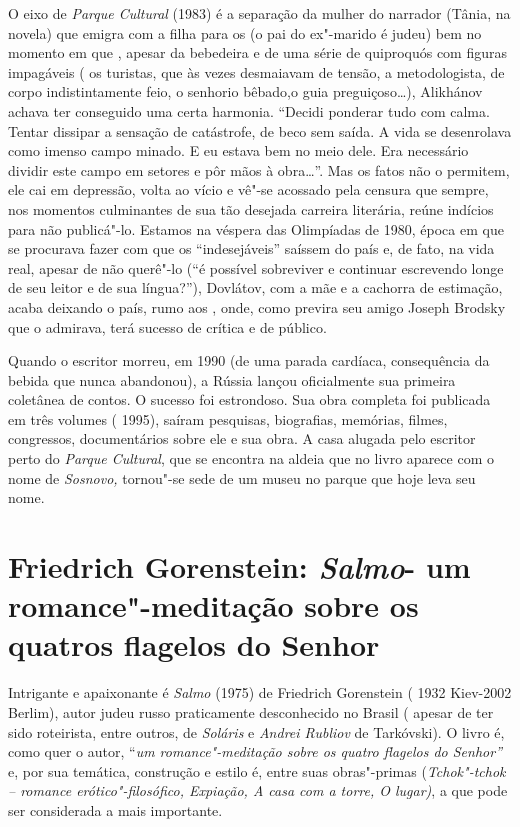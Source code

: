 O eixo de \emph{Parque Cultural} (1983) é a separação da mulher do
narrador (Tânia, na novela) que emigra com a filha para os  (o pai do
ex"-marido é judeu) bem no momento em que , apesar da bebedeira e de uma
série de quiproquós com figuras impagáveis ( os turistas, que às vezes
desmaiavam de tensão, a metodologista, de corpo indistintamente feio, o
senhorio bêbado,o guia preguiçoso\ldots{}), Alikhánov achava ter conseguido
uma certa harmonia. ``Decidi ponderar tudo com calma. Tentar dissipar a
sensação de catástrofe, de beco sem saída. A vida se desenrolava como
imenso campo minado. E eu estava bem no meio dele. Era necessário
dividir este campo em setores e pôr mãos à obra\ldots{}''. Mas os fatos não o
permitem, ele cai em depressão, volta ao vício e vê"-se acossado pela
censura que sempre, nos momentos culminantes de sua tão desejada
carreira literária, reúne indícios para não publicá"-lo. Estamos na
véspera das Olimpíadas de 1980, época em que se procurava fazer com que
os ``indesejáveis'' saíssem do país e, de fato, na vida real,
apesar de não querê"-lo (``é possível sobreviver e continuar escrevendo
longe de seu leitor e de sua língua?''), Dovlátov, com a mãe e a
cachorra de estimação, acaba deixando o país, rumo aos , onde, como
previra seu amigo Joseph Brodsky que o admirava, terá sucesso de crítica
e de público.

Quando o escritor morreu, em 1990 (de uma parada cardíaca, consequência
da bebida que nunca abandonou), a Rússia lançou oficialmente sua
primeira coletânea de contos. O sucesso foi estrondoso. Sua obra
completa foi publicada em três volumes ( 1995), saíram pesquisas,
biografias, memórias, filmes, congressos, documentários sobre ele e sua
obra. A casa alugada pelo escritor perto do \emph{Parque Cultural}, que
se encontra na aldeia que no livro aparece com o nome de \emph{Sosnovo,}
tornou"-se sede de um museu no parque que hoje leva seu nome.

\chapter{Friedrich Gorenstein: \emph{Salmo}- um romance"-meditação sobre os quatros flagelos do Senhor}

Intrigante e apaixonante é \emph{Salmo} (1975) de Friedrich Gorenstein (
1932 Kiev-2002 Berlim), autor judeu russo praticamente desconhecido no
Brasil ( apesar de ter sido roteirista, entre outros, de \emph{Soláris}
e \emph{Andrei Rubliov} de Tarkóvski). O livro é, como quer o autor,
``\emph{um romance"-meditação sobre os quatro flagelos do Senhor''} e,
por sua temática, construção e estilo é, entre suas obras"-primas
(\emph{Tchok"-tchok -- romance erótico"-filosófico, Expiação, A casa com a
torre, O lugar)}, a que pode ser considerada a mais importante.

